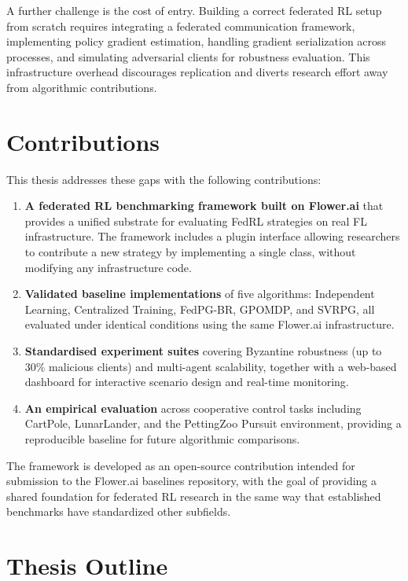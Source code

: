 \documentclass[a4paper, oneside]{discothesis}
\begin{document}
A further challenge is the cost of entry. Building a correct federated RL setup from scratch requires integrating a federated communication framework, implementing policy gradient estimation, handling gradient serialization across processes, and simulating adversarial clients for robustness evaluation. This infrastructure overhead discourages replication and diverts research effort away from algorithmic contributions.

\section{Contributions}

This thesis addresses these gaps with the following contributions:

\begin{enumerate}
    \item \textbf{A federated RL benchmarking framework built on Flower.ai} that provides a unified substrate for evaluating FedRL strategies on real FL infrastructure. The framework includes a plugin interface allowing researchers to contribute a new strategy by implementing a single class, without modifying any infrastructure code.

    \item \textbf{Validated baseline implementations} of five algorithms: Independent Learning, Centralized Training, FedPG-BR, GPOMDP, and SVRPG, all evaluated under identical conditions using the same Flower.ai infrastructure.

    \item \textbf{Standardised experiment suites} covering Byzantine robustness (up to 30\% malicious clients) and multi-agent scalability, together with a web-based dashboard for interactive scenario design and real-time monitoring.

    \item \textbf{An empirical evaluation} across cooperative control tasks including CartPole, LunarLander, and the PettingZoo Pursuit environment, providing a reproducible baseline for future algorithmic comparisons.
\end{enumerate}

The framework is developed as an open-source contribution intended for submission to the Flower.ai baselines repository, with the goal of providing a shared foundation for federated RL research in the same way that established benchmarks have standardized other subfields.

\section{Thesis Outline}
\end{document}
